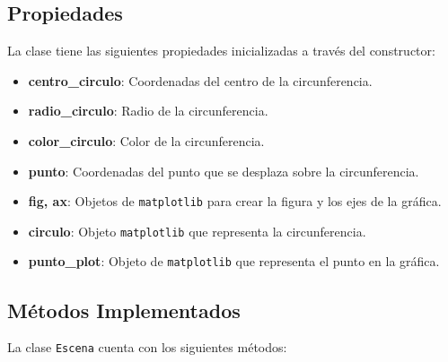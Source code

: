 \subsection{Propiedades}
La clase tiene las siguientes propiedades inicializadas a través del constructor:

\begin{itemize}
\item \textbf{centro\_circulo}: Coordenadas del centro de la circunferencia.
\item \textbf{radio\_circulo}: Radio de la circunferencia.
\item \textbf{color\_circulo}: Color de la circunferencia.
\item \textbf{punto}: Coordenadas del punto que se desplaza sobre la circunferencia.
\item \textbf{fig, ax}: Objetos de \texttt{matplotlib} para crear la figura y los ejes de la gráfica.
\item \textbf{circulo}: Objeto \texttt{matplotlib} que representa la circunferencia.
\item \textbf{punto\_plot}: Objeto de \texttt{matplotlib} que representa el punto en la gráfica.
\end{itemize}

\subsection{Métodos Implementados}
La clase \texttt{Escena} cuenta con los siguientes métodos:

